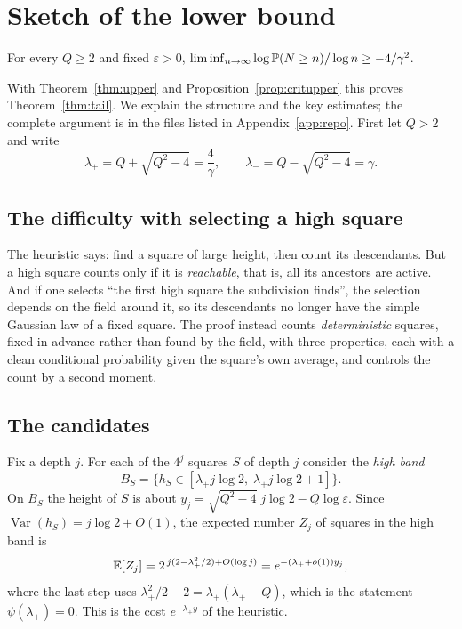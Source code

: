 \section{Sketch of the lower bound}\label{sec:lower}

\begin{theorem}\label{thm:lower}
For every $Q\ge2$ and fixed $\varepsilon>0$,
$\liminf_{n\to\infty}\log\mathbb{P}(N\ge n)/\log n\ge-4/\gamma^2$.
\end{theorem}

With Theorem~\ref{thm:upper} and Proposition~\ref{prop:critupper} this proves
Theorem~\ref{thm:tail}. We explain the structure and the key estimates; the complete argument is in
the files listed in Appendix~\ref{app:repo}. First let $Q>2$ and write
\[
\lambda_+=Q+\sqrt{Q^2-4}=\frac4\gamma,\qquad\lambda_-=Q-\sqrt{Q^2-4}=\gamma .
\]

\subsection{The difficulty with selecting a high square}

The heuristic says: find a square of large height, then count its descendants. But a high square
counts only if it is \emph{reachable}, that is, all its ancestors are active. And if one selects
``the first high square the subdivision finds'', the selection depends on the field around it, so
its descendants no longer have the simple Gaussian law of a fixed square. The proof instead counts
\emph{deterministic} squares, fixed in advance rather than found by the field, with three properties, each with a clean conditional probability
given the square's own average, and controls the count by a second moment.

\subsection{The candidates}

Fix a depth $j$. For each of the $4^j$ squares $S$ of depth $j$ consider the \emph{high band}
\[
B_S=\bigl\{h_S\in[\lambda_+j\log2,\;\lambda_+j\log2+1]\bigr\}.
\]
On $B_S$ the height of $S$ is about $y_j=\sqrt{Q^2-4}\;j\log2-Q\log\varepsilon$. Since
$\operatorname{Var}(h_S)=j\log2+O(1)$, the expected number $Z_j$ of squares in the high band is
\[
\mathbb{E}[Z_j]=2^{\,j(2-\lambda_+^2/2)+O(\log j)}=e^{-(\lambda_++o(1))y_j},
\]
where the last step uses $\lambda_+^2/2-2=\lambda_+(\lambda_+-Q)$, which is the statement
$\psi(\lambda_+)=0$. This is the cost $e^{-\lambda_+y}$ of the heuristic.

